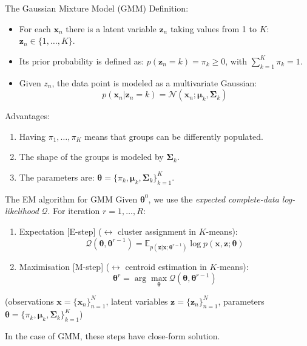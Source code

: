 \documentclass[11pt,aspectratio=169,usenames,dvipsnames]{beamer}
\newcommand{\bs}{\boldsymbol}
\begin{document}
\begin{frame}{The Gaussian Mixture Model (GMM)}
Definition:
\begin{itemize}
 \item For each $\bs{x}_n$ there is a latent variable $\bs{z}_n$ taking values from 1 to $K$: $\bs{z}_n\in\{1,\ldots,K\}$.\pause
 \item Its prior probability is defined as: $p(\bs{z}_n=k)=\pi_k\geq0$, with $\sum_{k=1}^K \pi_k = 1$.\pause
 \item Given $z_n$, the data point is modeled as a multivariate Gaussian:\vspace{-2mm}
 \[p(\bs{x}_n|\bs{z}_n=k) = \mathcal{N}(\bs{x}_n;\bs{\mu}_k,\bs{\Sigma}_k) \]
\end{itemize}
Advantages:
 \begin{enumerate}
  \item Having $\pi_1,\ldots,\pi_K$ means that groups can be differently populated.
  \item The shape of the groups is modeled by $\bs{\Sigma}_k$.
  \item The parameters are: {\color{orange}$\bs{\theta}=\{\pi_k,\bs{\mu}_k,\bs{\Sigma}_k\}_{k=1}^K$}.
 \end{enumerate}
\end{frame}

\begin{frame}{The EM algorithm for GMM}
 Given $\bs{\theta}^0$, we use the \textit{expected complete-data log-likelihood} $\mathcal{Q}$. For iteration $r=1,\ldots,R$:\vspace{2mm}
 \begin{enumerate}
  \item Expectation [E-step] ($\leftrightarrow$ cluster assignment in $K$-means):
  \[ \mathcal{Q}(\bs{\theta},\bs{\theta}^{r-1}) = \mathbb{E}_{p(\bs{z}|\bs{x};\bs{\theta}^{r-1})} \log p(\bs{x},\bs{z};\bs{\theta})\]\vspace{-5mm}
  \item Maximisation [M-step] ($\leftrightarrow$ centroid estimation in $K$-means): 
  \[ \bs{\theta}^r = \arg\max_{\bs{\theta}} \mathcal{Q}(\bs{\theta},\bs{\theta}^{r-1})\]
 \end{enumerate}
 {\footnotesize (observations $\bs{x}=\{\bs{x}_n\}_{n=1}^N$, latent variables $\bs{z}=\{\bs{z}_n\}_{n=1}^N$, parameters $\bs{\theta}=\{\pi_k,\bs{\mu}_k,\bs{\Sigma}_k\}_{k=1}^K$)}

In the case of GMM, these steps have close-form solution.
\end{frame}
\end{document}
